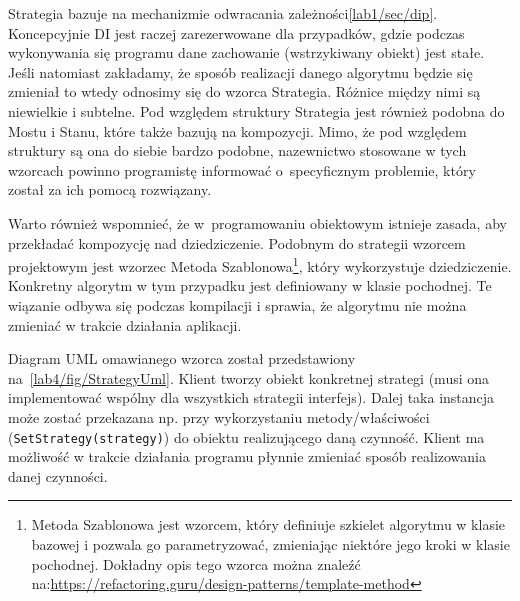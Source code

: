 Strategia bazuje na mechanizmie odwracania zależności\ref{lab1/sec/dip}. Koncepcyjnie DI jest raczej zarezerwowane dla przypadków, gdzie podczas wykonywania się programu dane zachowanie (wstrzykiwany obiekt) jest stałe. Jeśli natomiast zakładamy, że sposób realizacji danego algorytmu będzie się zmieniał to wtedy odnosimy się do wzorca Strategia. Różnice między nimi są niewielkie i subtelne. Pod względem struktury Strategia jest również podobna do Mostu i Stanu, które także bazują na kompozycji. Mimo, że pod względem struktury są ona do siebie bardzo podobne, nazewnictwo stosowane w tych wzorcach powinno programistę informować o~specyficznym problemie, który został za ich pomocą rozwiązany.

Warto również wspomnieć, że w~programowaniu obiektowym istnieje zasada, aby przekładać kompozycję nad dziedziczenie. Podobnym do strategii wzorcem projektowym jest wzorzec Metoda Szablonowa\footnote{Metoda Szablonowa jest wzorcem, który definiuje szkielet algorytmu w klasie bazowej i pozwala go parametryzować, zmieniając niektóre jego kroki w klasie pochodnej. Dokładny opis tego wzorca można znaleźć na:\url{https://refactoring.guru/design-patterns/template-method}}, który wykorzystuje dziedziczenie. Konkretny algorytm w tym przypadku jest definiowany w klasie pochodnej. Te wiązanie odbywa się podczas kompilacji i sprawia, że algorytmu nie można zmieniać w trakcie działania aplikacji. 



Diagram UML omawianego wzorca został przedstawiony na~\ref{lab4/fig/StrategyUml}. Klient tworzy obiekt konkretnej strategi (musi ona implementować wspólny dla wszystkich strategii interfejs). Dalej taka instancja może zostać przekazana np. przy wykorzystaniu metody/właściwości (\texttt{SetStrategy(strategy)}) do obiektu realizującego daną czynność. Klient ma możliwość w trakcie działania programu płynnie zmieniać sposób realizowania danej czynności.

